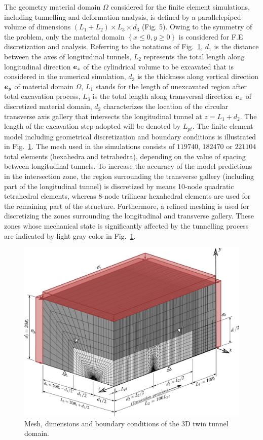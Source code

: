 \documentclass[Journal,letterpaper, NoLists,SectionNumbers]{ascelike-new}
\begin{document}
The geometry material domain $\Omega$ considered for the finite element simulations, including tunnelling and deformation analysis, is defined by a parallelepiped volume of dimensions $\left(L_1+L_2 \right ) \times L_3 \times d_3$ (Fig. 5). Owing to the symmetry of the problem, only the material domain $\left\{x \le 0, y \ge 0\right\}$   is considered for F.E discretization and analysis. Referring to the notations of Fig.~\ref{Mesh1}, $d_1$ is the distance between the axes of longitudinal tunnels, $L_2$  represents the total length  along longitudinal direction $\boldsymbol{e}_z$ of the cylindrical  volume to be excavated that is  considered in the numerical simulation, $d_3$ is the thickness along vertical direction $\boldsymbol{e}_y$ of material domain $\Omega$, $L_1$ stands for the length of unexcavated region after total excavation process, $L_3$ is the total length along transversal direction $\boldsymbol{e}_x$ of discretized material domain, $d_2$ characterizes the location of the circular transverse axis gallery that intersects the  longitudinal tunnel at $z = L_1+d_2$. The length of the excavation step adopted  will be denoted by $L_{pt}$. The finite element model including geometrical discretization and boundary conditions is illustrated in Fig.~\ref{Mesh1}. The mesh used in the simulations consists of $119740$, $182470$ or $221104$ total elements (hexahedra and tetrahedra), depending on the value of spacing between longitudinal tunnels. To increase the accuracy of the model predictions in the intersection zone, the region surrounding the transverse gallery (including part of the longitudinal tunnel) is discretized by means 10-node quadratic tetrahedral elements, whereas 8-node trilinear hexahedral elements are used for the remaining part of the structure.   Furthermore, a refined meshing is used for discretizing the zones surrounding the longitudinal and transverse gallery. These zones whose mechanical state is significantly affected by the tunnelling process are indicated by light gray color in Fig.~\ref{Mesh1}.
\begin{figure}[h!]
	\centering
	\includegraphics[scale=0.5]{Mesh1.pdf}
	\caption{Mesh, dimensions and boundary conditions of the 3D twin tunnel domain.}
	\label{Mesh1}
\end{figure}
\end{document}
